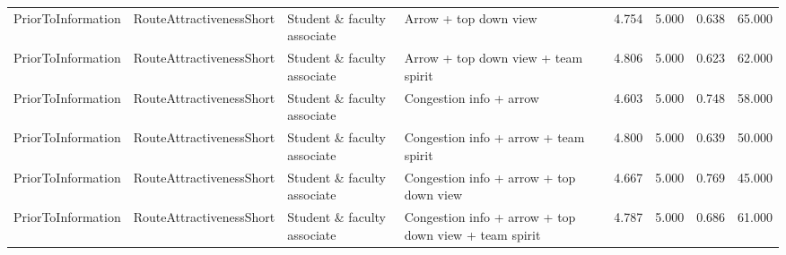 \begin{tabular}{llllrrrr}
  PriorToInformation & RouteAttractivenessShort & Student \& faculty associate & Arrow + top down view & 4.754 & 5.000 & 0.638 & 65.000 \\ 
  PriorToInformation & RouteAttractivenessShort & Student \& faculty associate & Arrow + top down view + team spirit & 4.806 & 5.000 & 0.623 & 62.000 \\ 
  PriorToInformation & RouteAttractivenessShort & Student \& faculty associate & Congestion info + arrow & 4.603 & 5.000 & 0.748 & 58.000 \\ 
  PriorToInformation & RouteAttractivenessShort & Student \& faculty associate & Congestion info + arrow + team spirit & 4.800 & 5.000 & 0.639 & 50.000 \\ 
  PriorToInformation & RouteAttractivenessShort & Student \& faculty associate & Congestion info + arrow + top down view & 4.667 & 5.000 & 0.769 & 45.000 \\ 
  PriorToInformation & RouteAttractivenessShort & Student \& faculty associate & Congestion info + arrow + top down view + team spirit & 4.787 & 5.000 & 0.686 & 61.000 \\ 
   \hline
\end{tabular}
